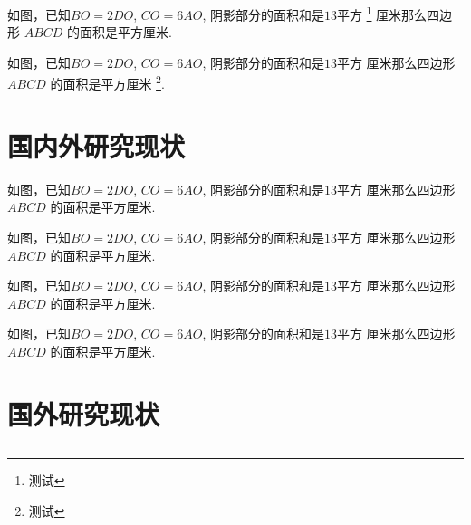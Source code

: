 \documentclass{USTBBook}
\begin{document}
\begin{question}
  \taskGrade[2]
  如图，已知$BO=2DO$, $CO=6AO$, 阴影部分的面积和是$13$平方 \footnote{测试}
  厘米那么四边形 $ABCD$ 的面积是\fillin[]平方厘米.
\end{question}

\begin{question}
  \taskGrade[5]
  如图，已知$BO=2DO$, $CO=6AO$, 阴影部分的面积和是$13$平方
  厘米那么四边形 $ABCD$ 的面积是\fillin[]平方厘米 \footnote{测试}.
\end{question}

\zhlipsum[6-7]

\newpage


\zhlipsum[6-7]

\newpage
\section{国内外研究现状}

\begin{question*}
  如图，已知$BO=2DO$, $CO=6AO$, 阴影部分的面积和是$13$平方
  厘米那么四边形 $ABCD$ 的面积是\fillin[]平方厘米.
\end{question*}

\begin{question*}
  如图，已知$BO=2DO$, $CO=6AO$, 阴影部分的面积和是$13$平方
  厘米那么四边形 $ABCD$ 的面积是\fillin[]平方厘米.
\end{question*}

\begin{question*}
  如图，已知$BO=2DO$, $CO=6AO$, 阴影部分的面积和是$13$平方
  厘米那么四边形 $ABCD$ 的面积是\fillin[]平方厘米.
\end{question*}

\begin{question*}
  如图，已知$BO=2DO$, $CO=6AO$, 阴影部分的面积和是$13$平方
  厘米那么四边形 $ABCD$ 的面积是\fillin[]平方厘米.
\end{question*}

\newpage
\section*{国外研究现状}

\subsection{}
\zhlipsum[4]
\end{document}
